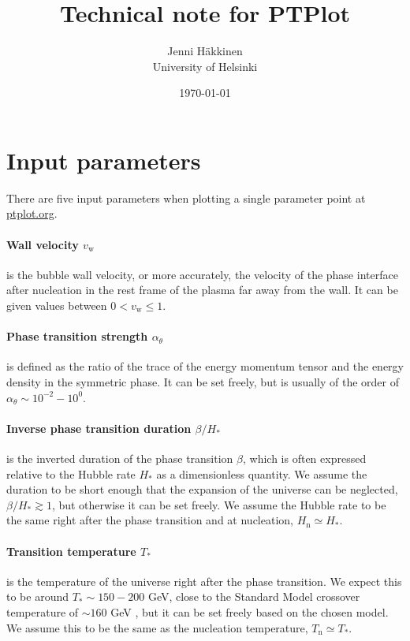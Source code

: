 \documentclass[10pt]{article}
\title{\textbf{Technical note for PTPlot}}
\author{Jenni Häkkinen\\ University of Helsinki}
\date{\today}
\begin{document}
\maketitle

\section{Input parameters}

There are five input parameters when plotting a single parameter point at \href{www.ptplot.org}{ptplot.org}.

\paragraph{Wall velocity $v_\mathrm{w}$} is the bubble wall velocity, or more accurately, the velocity of the phase interface after nucleation in the rest frame of the plasma far away from the wall. It can be given values between $0<v_\mathrm{w}\leq1$.

\paragraph{Phase transition strength $\alpha_\theta$} is defined as the ratio of the trace of the energy momentum tensor and the energy density in the symmetric phase. It can be set freely, but is usually of the order of $\alpha_\theta\sim10^{-2}-10^0$.

\paragraph{Inverse phase transition duration $\beta/H_*$} is the inverted duration of the phase transition $\beta$, which is often expressed relative to the Hubble rate $H_*$ as a dimensionless quantity. We assume the duration to be short enough that the expansion of the universe can be neglected, $\beta/H_*\gtrsim1$, but otherwise it can be set freely. We assume the Hubble rate to be the same right after the phase transition and at nucleation, $H_\mathrm{n}\simeq H_*$.

\paragraph{Transition temperature $T_*$} is the temperature of the universe right after the phase transition. We expect this to be around $T_*\sim150-200$ GeV, close to the Standard Model crossover temperature of $\sim160$ GeV \cite{weir18}, but it can be set freely based on the chosen model. We assume this to be the same as the nucleation temperature, $T_\mathrm{n}\simeq T_*$.
\end{document}
